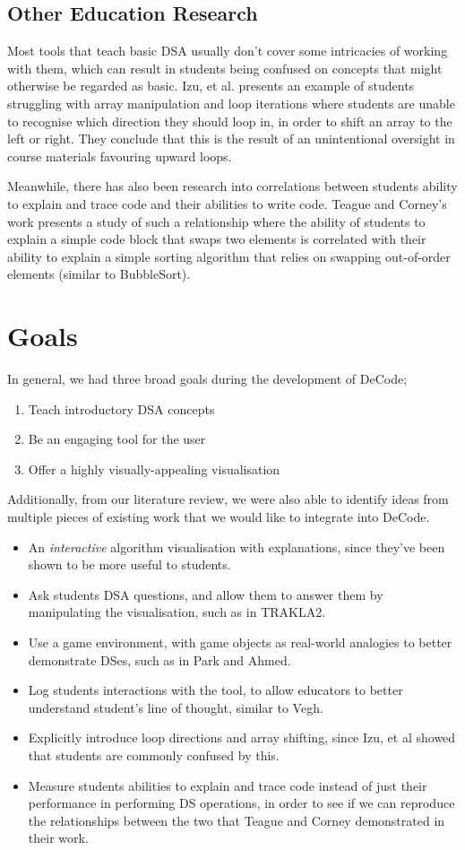 \documentclass[10pt]{article}
\begin{document}
\subsection{Other Education Research}
Most tools that teach basic DSA usually don't cover some intricacies of working with them, which can result in students being confused on concepts that might otherwise be regarded as basic. Izu, et al.\cite{izuloop} presents an example of students struggling with array manipulation and loop iterations where students are unable to recognise which direction they should loop in, in order to shift an array to the left or right. They conclude that this is the result of an unintentional oversight in course materials favouring upward loops.\par
Meanwhile, there has also been research into correlations between students ability to explain and trace code and their abilities to write code. Teague and Corney's work\cite{Teague:2012:SHW:2483716.2483727} presents a study of such a relationship where the ability of students to explain a simple code block that swaps two elements is correlated with their ability to explain a simple sorting algorithm that relies on swapping out-of-order elements (similar to BubbleSort).
\section{Goals}
In general, we had three broad goals during the development of DeCode;
\begin{enumerate}
  \item Teach introductory DSA concepts
  \item Be an engaging tool for the user
  \item Offer a highly visually-appealing visualisation
\end{enumerate}
Additionally, from our literature review, we were also able to identify ideas from multiple pieces of existing work that we would like to integrate into DeCode.
\begin{itemize}
  \item An \emph{interactive} algorithm visualisation with explanations, since they've been shown to be more useful to students\cite{vegh2}.
  \item Ask students DSA questions, and allow them to answer them by manipulating the visualisation, such as in TRAKLA2\cite{TRAKLA2}.
  \item Use a game environment, with game objects as real-world analogies to better demonstrate DSes, such as in Park and Ahmed\cite{Park}.
  \item Log students interactions with the tool, to allow educators to better understand student's line of thought, similar to Vegh\cite{vegh}.
  \item Explicitly introduce loop directions and array shifting, since Izu, et al\cite{izuloop} showed that students are commonly confused by this.
  \item Measure students abilities to explain and trace code instead of just their performance in performing DS operations, in order to see if we can reproduce the relationships between the two that Teague and Corney demonstrated in their work\cite{Teague:2012:SHW:2483716.2483727}. 
\end{itemize}
\end{document}
